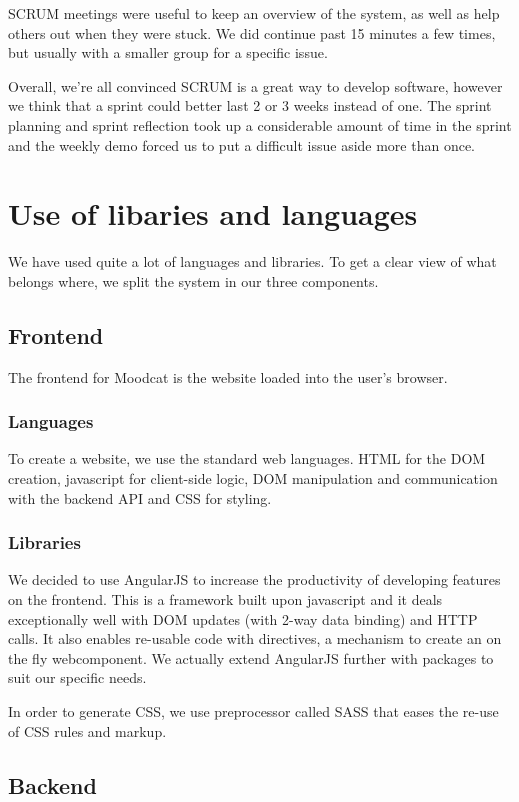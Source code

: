 SCRUM meetings were useful to keep an overview of the system, as well as help others out when they were stuck.
We did continue past 15 minutes a few times, but usually with a smaller group for a specific issue.

Overall, we're all convinced SCRUM is a great way to develop software, however we think that a sprint could better last 2 or 3 weeks instead of one.
The sprint planning and sprint reflection took up a considerable amount of time in the sprint and the weekly demo forced us to put a difficult issue aside more than once.

\section{Use of libaries and languages}
We have used quite a lot of languages and libraries.
To get a clear view of what belongs where, we split the system in our three components.

\subsection{Frontend}
The frontend for Moodcat is the website loaded into the user's browser.

\subsubsection{Languages}
To create a website, we use the standard web languages.
HTML for the DOM creation, javascript for client-side logic, DOM manipulation and communication with the backend API and CSS for styling.

\subsubsection{Libraries}
We decided to use AngularJS to increase the productivity of developing features on the frontend.
This is a framework built upon javascript and it deals exceptionally well with DOM updates (with 2-way data binding) and HTTP calls.
It also enables re-usable code with directives, a mechanism to create an on the fly webcomponent.
We actually extend AngularJS further with packages to suit our specific needs.

In order to generate CSS, we use preprocessor called SASS that eases the re-use of CSS rules and markup.

\subsection{Backend}

